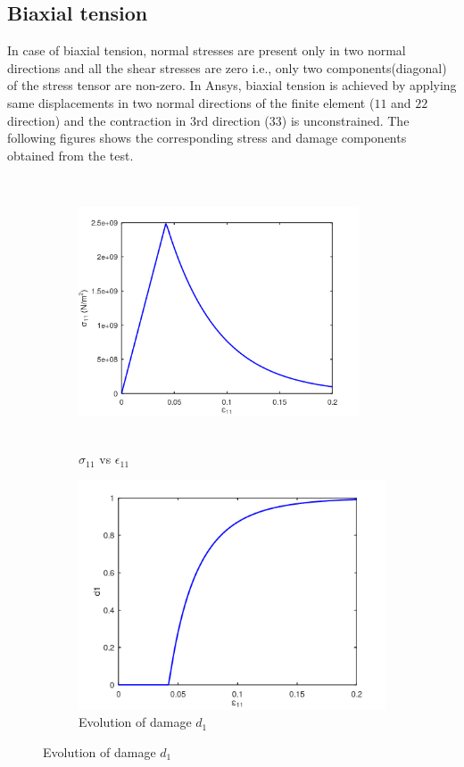 \documentclass[a4paper,12pt,twoside]{report}
\begin{document}
\subsection{Biaxial tension}
\indent\indent\indent  In case of biaxial tension, normal stresses are present only in two normal directions and all the shear stresses are zero  i.e., only two components(diagonal) of the stress tensor are non-zero. In Ansys, biaxial tension is achieved by applying same displacements in two normal directions of the finite element ($11$ and $22$ direction) and the contraction in 3rd direction ($33$) is unconstrained. The following figures shows the corresponding stress and damage components obtained from the test.
\begin{figure}[hbt!]
     \captionsetup[subfigure]{justification=centering}
     \begin{subfigure}{0.4\textwidth}
         \includegraphics[width=8.3cm,height=8cm,keepaspectratio]{23.S11vsE11.png}
         \caption{$\sigma_{11}$ vs $\epsilon_{11}$}
         \label{fig:S11vsE11}
     \end{subfigure}
	\hspace{1.8cm}
     \captionsetup[subfigure]{justification=centering}
     \begin{subfigure}{0.4\textwidth}
         \includegraphics[width=1.25\textwidth]{23.d1.png}
         \caption{Evolution of damage $d_{1}$}
         \label{fig:Evolution of damage d1}
     \end{subfigure}
\end{figure}
\end{document}
